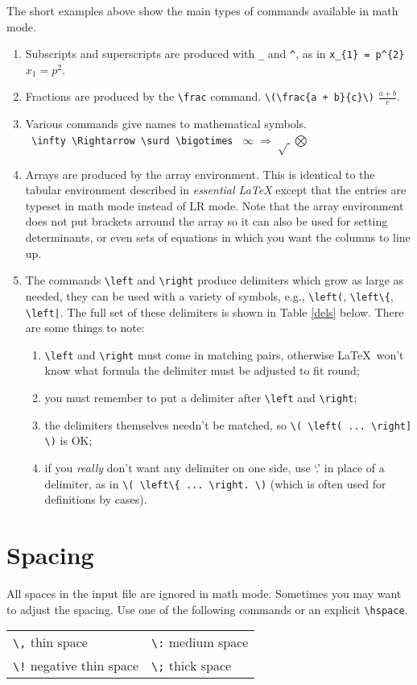 \documentclass[a4paper]{article}
\begin{document}
The short examples above show the main types of commands available 
in math mode.
\begin{enumerate}
\item Subscripts and superscripts are produced with \verb|_| and \verb|^|, as in
      \verb|x_{1} = p^{2}| \(x_{1} = p^{2}\). 
\item Fractions are produced by the \verb|\frac| command. 
      \verb|\(\frac{a + b}{c}\)| \(\frac{a + b}{c}\).
\item Various commands give names to mathematical symbols.\\
      \verb| \infty \Rightarrow \surd \bigotimes | 
      \(\infty\;\Rightarrow\;\surd\;\bigotimes\)
\item Arrays are produced by the array environment. This is identical
      to the tabular environment described in {\em essential \LaTeX\/}
      except that the entries are typeset in math mode instead of LR mode.
      Note that the array environment does not put brackets arround the array
      so it can also be used for setting determinants, or even 
      sets of equations in which you want the columns to line up.
\item The commands \verb|\left| and \verb|\right| produce delimiters which
      grow as large as needed, they can be used with a variety of symbols,
      e.g., \verb|\left(|, \verb|\left\{|, \verb!\left|!. The full set of 
      these delimiters is shown in Table \ref{dels} below.  There are
      some things to note: 
      \begin{enumerate}
      \item \verb|\left| and \verb|\right| must come in matching
      pairs, otherwise \LaTeX\ won't know what formula the delimiter
      must be adjusted to fit round; 
      \item you must remember to put a delimiter after \verb|\left| 
      and \verb|\right|; 
      \item the delimiters themselves needn't be matched, so 
      \verb|\( \left( ... \right] \)|
      is OK; 
      \item if you \textit{really} don't want any delimiter on
      one side, use `.' in place of a delimiter, as in 
      \verb|\( \left\{ ... \right. \)| (which is often used for definitions
      by cases).
      \end{enumerate}
\end{enumerate}

\section{Spacing}
All spaces in the input file are ignored in math mode. Sometimes
you may want to adjust the spacing. Use one of the following commands
or an explicit \verb|\hspace|.
\begin{center}
\begin{tabular}{ll}
\verb|\,| thin space          &\verb|\:| medium space \\
\verb|\!| negative thin space &\verb|\;| thick space \\
\end{tabular}
\end{center}
\end{document}
